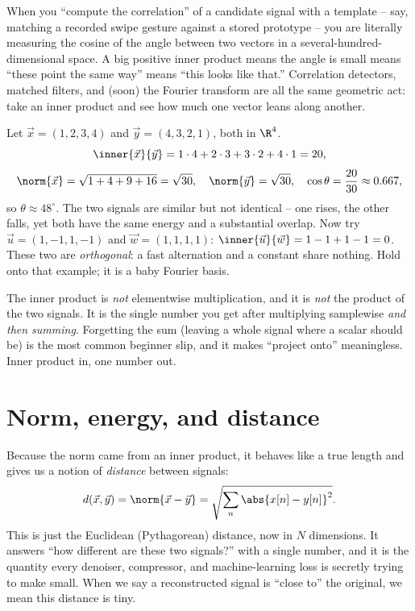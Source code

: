 \begin{happeningbox}
When you ``compute the correlation'' of a candidate signal with a template -- say, matching a
recorded swipe gesture against a stored prototype -- you are literally measuring the cosine of the
angle between two vectors in a several-hundred-dimensional space. A big positive inner product means
the angle is small means ``these point the same way'' means ``this looks like that.'' Correlation
detectors, matched filters, and (soon) the Fourier transform are all the same geometric act: take an
inner product and see how much one vector leans along another.
\end{happeningbox}

\begin{example}
\label{ch03:ex-inner}
Let $\vec{x}=(1,2,3,4)$ and $\vec{y}=(4,3,2,1)$, both in $\R^4$.
\[
  \inner{\vec{x}}{\vec{y}} = 1\cdot4 + 2\cdot3 + 3\cdot2 + 4\cdot1 = 20,
\]
\[
  \norm{\vec{x}} = \sqrt{1+4+9+16}=\sqrt{30},\quad \norm{\vec{y}}=\sqrt{30},
  \quad \cos\theta = \frac{20}{30}\approx 0.667,
\]
so $\theta\approx 48^\circ$. The two signals are similar but not identical -- one rises, the other
falls, yet both have the same energy and a substantial overlap. Now try $\vec{u}=(1,-1,1,-1)$ and
$\vec{w}=(1,1,1,1)$: $\inner{\vec{u}}{\vec{w}} = 1-1+1-1 = 0$. These two are \emph{orthogonal}: a
fast alternation and a constant share nothing. Hold onto that example; it is a baby Fourier basis.
\end{example}

\begin{trapbox}
The inner product is \emph{not} elementwise multiplication, and it is \emph{not} the product of the
two signals. It is the single number you get after multiplying samplewise \emph{and then summing}.
Forgetting the sum (leaving a whole signal where a scalar should be) is the most common beginner
slip, and it makes ``project onto'' meaningless. Inner product in, one number out.
\end{trapbox}

\section{Norm, energy, and distance}
\label{ch03:norm}

Because the norm came from an inner product, it behaves like a true length and gives us a notion
of \emph{distance} between signals:
\[
  d(\vec{x},\vec{y}) = \norm{\vec{x}-\vec{y}} = \sqrt{\sum_n \abs{x[n]-y[n]}^2}.
\]
This is just the Euclidean (Pythagorean) distance, now in $N$ dimensions. It answers ``how different
are these two signals?'' with a single number, and it is the quantity every denoiser, compressor,
and machine-learning loss is secretly trying to make small. When we say a reconstructed signal is
``close to'' the original, we mean this distance is tiny.

